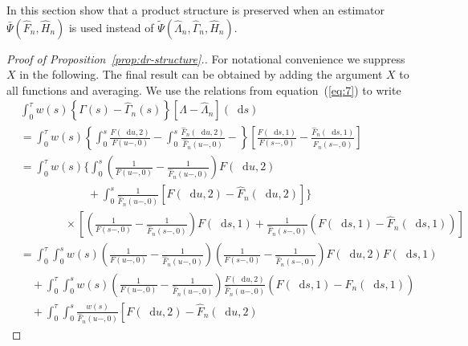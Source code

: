 \documentclass[numsec,webpdf,contemporary,medium,namedate]{oup-authoring-template}%
\theoremstyle{thmstyleone}%
\theoremstyle{thmstyletwo}%
\theoremstyle{thmstylethree}%
\newcommand*\diff{\mathop{}\!\mathrm{d}}
\newcommand{\1}{\mathds{1}}
\begin{document}
\begin{appendices}
In this section show that a product structure is preserved when an estimator
$\bar\Psi(\hat{F}_n, \hat{H}_n)$ is used instead of
$\tilde\Psi(\hat{\Lambda}_n, \hat{\Gamma}_n, \hat{H}_n)$.


\begin{proof}[Proof of Proposition~\ref{prop:dr-structure}.]
  For notational convenience we suppress \( X \) in the following. The final
  result can be obtained by adding the argument \( X \) to all functions and
  averaging. We use the relations from equation~(\ref{eq:7}) to write
  \begin{align*}
    & \int_0^{\tau} w(s) 
      \left\{
      \Gamma(s) - \hat{\Gamma}_n(s)
      \right\}
      [\Lambda - \hat{\Lambda}_n](\diff s)
    \\
    & =
      \int_0^{\tau} w(s) 
      \left\{
      \int_0^s \frac{F(\diff u, 2)}{F(u-, 0)} -
      \int_0^s \frac{\hat{F}_n(\diff u, 2)}{\hat{F}_n(u-, 0)}  -
      \right\}
      \left[
      \frac{F(\diff s, 1)}{F(s-, 0)}
      - \frac{\hat{F}_n(\diff s, 1)}{\hat{F}_n(s-, 0)}
      \right]
    \\
    & =
      \int_0^{\tau} w(s) 
      \Bigg\{
      \int_0^s 
      \left(
      \frac{1}{F(u-, 0)} -  \frac{1}{\hat{F}_n(u-, 0)}
      \right) F(\diff u, 2)
    \\
    & \qquad\qquad \qquad
      +
      \int_0^s \frac{1}{\hat{F}_n(u-, 0)} 
      \left[
      F(\diff u, 2) - \hat{F}_n(\diff u, 2)
      \right]
      \Bigg\}
    \\
    & \qquad\qquad \times
      \left[
      \left(
      \frac{1}{F(s-, 0)} -
      \frac{1}{\hat{F}_n(s-, 0)}
      \right)F(\diff s, 1)
       + \frac{1}{\hat{F}_n(s-, 0)}
      \left(
      F(\diff s, 1) -
      \hat{F}_n(\diff s, 1)
      \right)
      \right]
    \\
    &
      = \int_0^{\tau} 
      \int_0^s
      w(s) 
      \left(
      \frac{1}{F(u-, 0)} -  \frac{1}{\hat{F}_n(u-, 0)}
      \right) 
      \left(
      \frac{1}{F(s-, 0)} -
      \frac{1}{\hat{F}_n(s-, 0)}
      \right)F(\diff u, 2)F(\diff s, 1)
    \\
    & \quad +
      \int_0^{\tau}
      \int_0^s
      w(s) 
      \left(
      \frac{1}{F(u-, 0)} -  \frac{1}{\hat{F}_n(u-, 0)}
      \right) \frac{F(\diff u, 2) }{\hat{F}_n(u-,0)}
      \left(
      F(\diff s, 1) -
      \hat{F}_n(\diff s, 1)
      \right)
    \\
    & \quad +
      \int_0^{\tau} 
      \int_0^s      
      \frac{w(s) }{\hat{F}_n(u-, 0)} 
      \left[
      F(\diff u, 2) - \hat{F}_n(\diff u, 2)

\end{align*}
\end{proof}
\end{appendices}
\end{document}
